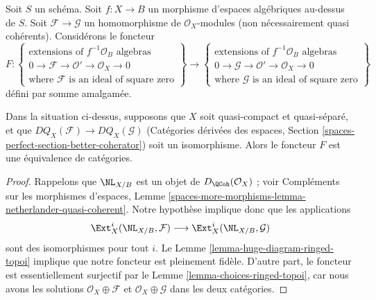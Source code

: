 \noindent
Soit $S$ un schéma. Soit $f : X \to B$ un morphisme d'espaces algébriques
au-dessus de $S$.
Soit $\mathcal{F} \to \mathcal{G}$ un homomorphisme de
$\mathcal{O}_X$-modules (non nécessairement quasi cohérents).
Considérons le foncteur
$$
F :
\left\{
\begin{matrix}
\text{extensions of }f^{-1}\mathcal{O}_B\text{ algebras}\\
0 \to \mathcal{F} \to \mathcal{O}' \to \mathcal{O}_X \to 0\\
\text{where }\mathcal{F}\text{ is an ideal of square zero}
\end{matrix}
\right\}
\longrightarrow
\left\{
\begin{matrix}
\text{extensions of }f^{-1}\mathcal{O}_B\text{ algebras}\\
0 \to \mathcal{G} \to \mathcal{O}' \to \mathcal{O}_X \to 0\\
\text{where }\mathcal{G}\text{ is an ideal of square zero}
\end{matrix}
\right\}
$$
défini par somme amalgamée.

\begin{lemma}
\label{lemma-thickening-space-quasi-coherent}
Dans la situation ci-dessus, supposons que $X$ soit quasi-compact et
quasi-séparé, et que $DQ_X(\mathcal{F}) \to DQ_X(\mathcal{G})$
(Catégories dérivées des espaces, Section
\ref{spaces-perfect-section-better-coherator}) soit un isomorphisme.
Alors le foncteur $F$ est une équivalence de catégories.
\end{lemma}

\begin{proof}
Rappelons que $\NL_{X/B}$ est un objet de $D_\QCoh(\mathcal{O}_X)$ ; voir
Compléments sur les morphismes d'espaces, Lemme
\ref{spaces-more-morphisms-lemma-netherlander-quasi-coherent}.
Notre hypothèse implique donc que les applications
$$
\Ext^i_X(\NL_{X/B}, \mathcal{F}) \longrightarrow
\Ext^i_X(\NL_{X/B}, \mathcal{G})
$$
sont des isomorphismes pour tout $i$. Le
Lemme \ref{lemma-huge-diagram-ringed-topoi} implique que notre foncteur est
pleinement fidèle. D'autre part, le foncteur est essentiellement surjectif par
le Lemme \ref{lemma-choices-ringed-topoi}, car nous avons les solutions
$\mathcal{O}_X \oplus \mathcal{F}$ et $\mathcal{O}_X \oplus \mathcal{G}$ dans
les deux catégories.
\end{proof}

